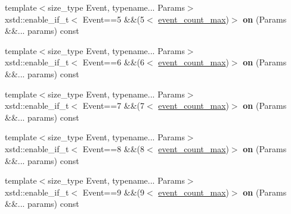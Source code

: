 \begin{DoxyCompactItemize}
\item 
\mbox{\label{classgko_1_1log_1_1Logger_a32ae43ad7dd033e2938f7a0b7b3f2bc1}} 
{\footnotesize template$<$size\+\_\+type Event, typename... Params$>$ }\\xstd\+::enable\+\_\+if\+\_\+t$<$ Event==5 \&\&(5$<$ \hyperlink{classgko_1_1log_1_1Logger_a8794cd4bf2fd4d24ba9879bdca884dab}{event\+\_\+count\+\_\+max})$>$ {\bfseries on} (Params \&\&... params) const
\item 
\mbox{\label{classgko_1_1log_1_1Logger_a5701d904643590bb14b479907ae15fda}} 
{\footnotesize template$<$size\+\_\+type Event, typename... Params$>$ }\\xstd\+::enable\+\_\+if\+\_\+t$<$ Event==6 \&\&(6$<$ \hyperlink{classgko_1_1log_1_1Logger_a8794cd4bf2fd4d24ba9879bdca884dab}{event\+\_\+count\+\_\+max})$>$ {\bfseries on} (Params \&\&... params) const
\item 
\mbox{\label{classgko_1_1log_1_1Logger_a5cbbb23056e379164d77ca79b08ff8ae}} 
{\footnotesize template$<$size\+\_\+type Event, typename... Params$>$ }\\xstd\+::enable\+\_\+if\+\_\+t$<$ Event==7 \&\&(7$<$ \hyperlink{classgko_1_1log_1_1Logger_a8794cd4bf2fd4d24ba9879bdca884dab}{event\+\_\+count\+\_\+max})$>$ {\bfseries on} (Params \&\&... params) const
\item 
\mbox{\label{classgko_1_1log_1_1Logger_a2a681729c29dd9772547b46eac3f2435}} 
{\footnotesize template$<$size\+\_\+type Event, typename... Params$>$ }\\xstd\+::enable\+\_\+if\+\_\+t$<$ Event==8 \&\&(8$<$ \hyperlink{classgko_1_1log_1_1Logger_a8794cd4bf2fd4d24ba9879bdca884dab}{event\+\_\+count\+\_\+max})$>$ {\bfseries on} (Params \&\&... params) const
\item 
\mbox{\label{classgko_1_1log_1_1Logger_a79ca71594e8a80db27ecd39961165360}} 
{\footnotesize template$<$size\+\_\+type Event, typename... Params$>$ }\\xstd\+::enable\+\_\+if\+\_\+t$<$ Event==9 \&\&(9$<$ \hyperlink{classgko_1_1log_1_1Logger_a8794cd4bf2fd4d24ba9879bdca884dab}{event\+\_\+count\+\_\+max})$>$ {\bfseries on} (Params \&\&... params) const
\item 
\mbox{\label{classgko_1_1log_1_1Logger_ad4dcb530adfde9a655cf29d5ef6a3892}} 

\end{DoxyCompactItemize}
